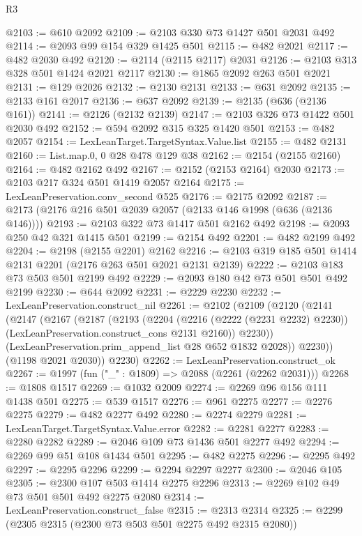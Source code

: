 \begin{lexlean}{R3}
\begin{coremodule}
@2103 := @610 @2092
@2109 := @2103 @330 @73 @1427 @501 @2031 @492
@2114 := @2093 @99 @154 @329 @1425 @501
@2115 := @482 @2021
@2117 := @482 @2030 @492
@2120 := @2114 (@2115 @2117) @2031
@2126 := @2103 @313 @328 @501 @1424 @2021 @2117
@2130 := @1865 @2092 @263 @501 @2021
@2131 := @129 @2026
@2132 := @2130 @2131
@2133 := @631 @2092
@2135 := @2133 @161 @2017
@2136 := @637 @2092
@2139 := @2135 (@636 (@2136 @161))
@2141 := @2126 (@2132 @2139)
@2147 := @2103 @326 @73 @1422 @501 @2030 @492
@2152 := @594 @2092 @315 @325 @1420 @501
@2153 := @482 @2057
@2154 := LexLeanTarget.TargetSyntax.Value.list
@2155 := @482 @2131
@2160 := List.map.{0, 0} @28 @478 @129 @38
@2162 := @2154 (@2155 @2160)
@2164 := @482 @2162 @492
@2167 := @2152 (@2153 @2164) @2030
@2173 := @2103 @217 @324 @501 @1419 @2057 @2164
@2175 := LexLeanPreservation.conv_second @525
@2176 := @2175 @2092
@2187 := @2173 (@2176 @216 @501 @2039 @2057 (@2133 @146 @1998 (@636 (@2136 @146))))
@2193 := @2103 @322 @73 @1417 @501 @2162 @492
@2198 := @2093 @250 @42 @321 @1415 @501
@2199 := @2154 @492
@2201 := @482 @2199 @492
@2204 := @2198 (@2155 @2201) @2162
@2216 := @2103 @319 @185 @501 @1414 @2131 @2201 (@2176 @263 @501 @2021 @2131 @2139)
@2222 := @2103 @183 @73 @503 @501 @2199 @492
@2229 := @2093 @180 @42 @73 @501 @501 @492 @2199
@2230 := @644 @2092
@2231 := @2229 @2230
@2232 := LexLeanPreservation.construct_nil
@2261 := @2102
    (@2109
      (@2120
        (@2141
          (@2147
            (@2167
              (@2187
                (@2193
                  (@2204
                    (@2216 (@2222 (@2231 @2232) @2230))
                    (LexLeanPreservation.construct_cons @2131 @2160))
                  @2230))
              (LexLeanPreservation.prim_append_list @28 @652 @1832 @2028))
            @2230))
        (@1198 @2021 @2030))
      @2230)
@2262 := LexLeanPreservation.construct_ok
@2267 := @1997 (fun ("_" : @1809) => @2088 (@2261 (@2262 @2031)))
@2268 := @1808 @1517
@2269 := @1032 @2009
@2274 := @2269 @96 @156 @111 @1438 @501
@2275 := @539 @1517
@2276 := @961 @2275
@2277 := @2276 @2275
@2279 := @482 @2277 @492
@2280 := @2274 @2279
@2281 := LexLeanTarget.TargetSyntax.Value.error
@2282 := @2281 @2277
@2283 := @2280 @2282
@2289 := @2046 @109 @73 @1436 @501 @2277 @492
@2294 := @2269 @99 @51 @108 @1434 @501
@2295 := @482 @2275
@2296 := @2295 @492
@2297 := @2295 @2296
@2299 := @2294 @2297 @2277
@2300 := @2046 @105
@2305 := @2300 @107 @503 @1414 @2275 @2296
@2313 := @2269 @102 @49 @73 @501 @501 @492 @2275 @2080
@2314 := LexLeanPreservation.construct_false
@2315 := @2313 @2314
@2325 := @2299 (@2305 @2315 (@2300 @73 @503 @501 @2275 @492 @2315 @2080))

\end{coremodule}
\end{lexlean}
